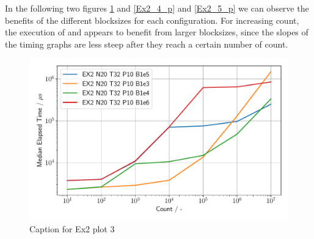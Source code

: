 \pagebreak

In the following two figures \ref{Ex2_3_p} and \ref{Ex2_4_p} and \ref{Ex2_5_p} we can observe
the benefits of the different blocksizes for each configuration. For increasing
count, the execution of  and   appears to benefit from larger
blocksizes, since the slopes of the timing graphs are less steep after they reach a certain number of count.


\begin{figure}[h]
    \begin{center}
        \includegraphics[width=1.0\linewidth]{figures/Ex2_3.pdf}
        \caption{Caption for Ex2 plot 3}
        \label{Ex2_3_p}
    \end{center}
\end{figure}



